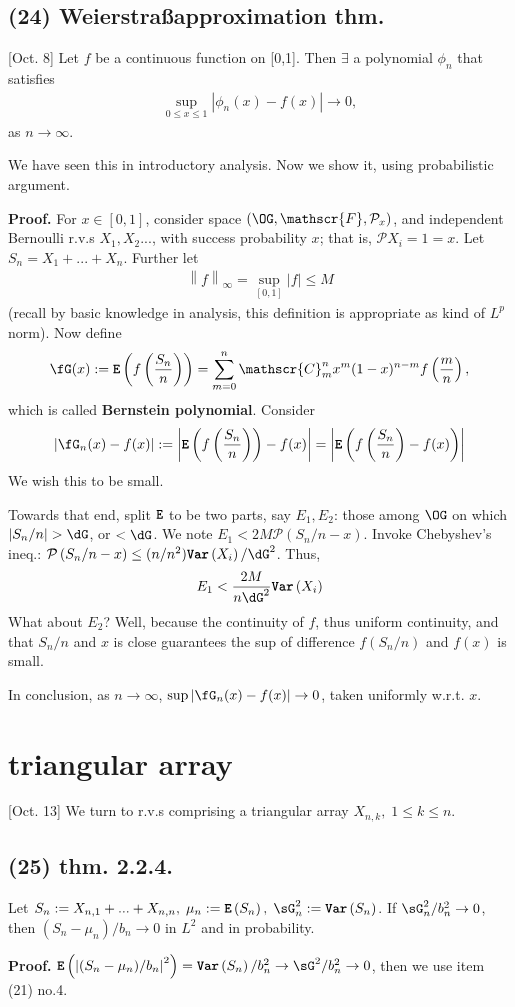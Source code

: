 \documentclass[12pt]{article}
\newcommand\oo\infty%
\newcommand\F\frac%
\newcommand\Ex\exists%
\newcommand{\Rb}[1]{ \left( #1 \right) }%
\newcommand{\Nm}[1]{ \left| #1 \right| } %
\newcommand{\CF}[1]{ \mathcal{#1} }%
\newcommand{\SF}[1]{ \mathscr{#1} }%
\newcommand{\Ss}[1]{\textsf{\textbf{#1}}}%
\newcommand{\Tw}[1]{\texttt{\textbf{#1}}}%
\newcommand{\EqGo}[1]{ \begin{gather*}{#1}\end{gather*} } %
\renewcommand{\P}[1]{ \CF{P} \Rb{#1} }%
\newcommand{\E}[1]{ \Tw{E}\Rb{#1} }%
\newcommand{\Var}[1]{ \Tw{Var}\Rb{#1} }%
\begin{document}
\subsection*{(24) Weierstra\ss\;approximation thm.} [Oct. 8] Let \(f\) be a continuous function on [0,1]. 
Then \(\Ex\) a polynomial \(\phi_n\) that satisfies \EqGo{
 \sup_{0 \leq x \leq 1} |\phi_n(x) - f(x)| \to 0,
} as \(n \to \oo\). \par
We have seen this in introductory analysis. 
Now we show it, using probabilistic argument. \par
\Ss{Proof.} For \(x \in [0,1]\), consider space \((\OG, \SF{F}, \CF{P}_x)\), 
and independent Bernoulli r.v.s \(X_1, X_2...\), with success probability \(x\); 
that is, \(\CF{P}{X_i =1} =x\). 
Let \(S_n = X_1 +...+ X_n\). 
Further let \EqGo{
 \left\lVert f \right\rVert_\oo = \sup_{[0,1]} |f| \leq M
} (recall by basic knowledge in analysis, this definition is appropriate as kind of \(L^p\) norm). 
Now define \EqGo{
 \fG (x) := \E{ f\Rb{\F{S_n}{n}} } 
 = \sum_{m=0}^n \SF C_m^n x^m (1-x)^{n-m} f\Rb{\F{m}{n}},
} which is called \Ss{Bernstein polynomial}. 
Consider \EqGo{
|\fG_n(x) - f(x)| 
:= \Nm{ \E{ f\Rb{\F{S_n}{n}} } - f(x) }
= \Nm{ \E{ f\Rb{\F{S_n}{n}} - f(x) } }
} We wish this to be small. \par
Towards that end, split \(\Tw{E}\) to be two parts, say \(E_1, E_2\): those among \(\OG\) on which \(|S_n /n| > \dG\), or \(< \dG\). 
We note \(E_1 < 2M \P{ S_n /n - x }\). 
Invoke Chebyshev's ineq.: \(\P{ S_n /n - x } \leq (n/ n^2) \Var{X_i} /\dG^2\). 
Thus, \EqGo{
 E_1 < \F{2M}{n \dG^2} \Var{X_i}
} \indent What about \(E_2\)? Well, because the continuity of \(f\), 
thus uniform continuity, and that \(S_n /n\) and \(x\) is close guarantees the sup of difference \(f(S_n /n)\) and \(f(x)\) is small. \par
In conclusion, as \(n \to \oo\), \(\sup |\fG_n(x) - f(x)| \to 0\), taken uniformly w.r.t. \(x\). \par

\section{triangular array}
[Oct. 13] We turn to r.v.s comprising a triangular array \(X_{n,k},\; 1 \leq k \leq n\). 

\subsection*{(25) thm. 2.2.4.} Let \(S_n := X_{n,1} +...+ X_{n,n},\; \mu_n := \E{S_n},\; \sG_n^2 := \Var{S_n}\). 
If \(\sG_n^2 / b_n^2 \to 0\), then \((S_n - \mu_n) / b_n \to 0\) in \(L^2\) and in probability. \par
\Ss{Proof.} \(
 \E{ \Nm{(S_n-\mu_n)/b_n}^2 } 
 = \Var{S_n} / b_n^2
 \to \sG^2 / b_n^2 \to 0
\), then we use item (21) no.4. 
\end{document}
